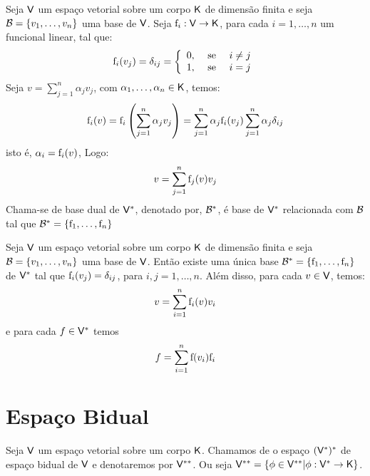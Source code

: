 \documentclass[10pt,a4paper]{book}
\begin{document}
\begin{definition}
	Seja $\mathsf{ V }$ um espaço vetorial sobre um corpo $\mathsf{ K }$ de dimensão finita e seja $\mathcal{ B } = \{ v_1, \dots, v_n \}$ uma base de $\mathsf{ V }$. Seja $\mathrm{ f }_i : \mathsf{ V } \rightarrow \mathsf{ K }$, para cada $i = 1, \dots, n$ um funcional linear, tal que:
	\[
		\mathrm{ f }_i(v_j) = \delta_{ij} = \left\{
		\begin{array}{lll}
			0, &\text{ se } & i \neq j\\
			1, &\text{ se } & i = j\\
		\end{array} \right.
	\]
	Seja $v = \displaystyle\sum_{j = 1}^{n} \alpha_j v_j$, com $\alpha_1, \dots, \alpha_n \in \mathsf{ K }$, temos:
	\[
		\mathrm{ f }_i(v) = \mathrm{ f }_i \left(\sum_{j = 1}^{n} \alpha_j v_j\right) = \sum_{j = 1}^{n} \alpha_j \mathrm{ f }_i(v_j)
		\sum_{j = 1}^{n} \alpha_j \delta_{ij}
	\]
	isto é, $\alpha_i = \mathrm{ f }_i(v)$, Logo:
	\[
		v = \displaystyle\sum_{j = 1}^{n} \mathrm{ f }_j(v) v_j
	\]
	Chama-se de base dual de $\mathsf{ V } ^ *$, denotado por, $\mathcal{ B } ^ *$, é base de $\mathsf{ V } ^ *$ relacionada com $\mathcal{ B }$ tal que $\mathcal{ B } ^ * = \{ \mathrm{ f }_1, \dots, \mathrm{ f }_n \}$
\end{definition}

\begin{theorem}
	Seja $\mathsf{ V }$ um espaço vetorial sobre um corpo $\mathsf{ K }$ de dimensão finita e seja $\mathcal{ B } = \{ v_1, \dots, v_n \}$ uma base de $\mathsf{ V }$. Então existe uma única base $\mathcal{ B } ^ * = \{ \mathrm{ f }_1, \dots, \mathrm{ f }_n \}$ de $\mathsf{ V } ^ *$ tal que $\mathrm{ f }_i(v_j) = \delta_{ij}$, para $i,j = 1, \dots, n$. Além disso, para cada $v \in \mathsf{ V }$, temos:
	\[
		v = \displaystyle\sum_{i = 1}^{n} \mathrm{ f }_i(v) v_i
	\]
	e para cada $f \in \mathsf{ V } ^ *$ temos
	\[
		f = \displaystyle\sum_{i = 1}^{n} \mathrm{ f }(v_i) \mathrm{ f }_i
	\]
\end{theorem}




\section{Espaço Bidual}

\begin{definition}
	Seja $\mathsf{ V }$ um espaço vetorial sobre um corpo $\mathsf{ K }$. Chamamos de o espaço $(\mathsf{ V } ^ *) ^ *$ de espaço bidual de $\mathsf{ V }$ e denotaremos por $\mathsf{ V }^{**}$. Ou seja $\mathsf{ V }^{**} = \{ \phi \in \mathsf{ V }^{**} | \phi : \mathsf{ V } ^ * \rightarrow \mathsf{ K } \}$.
\end{definition}
\end{document}
